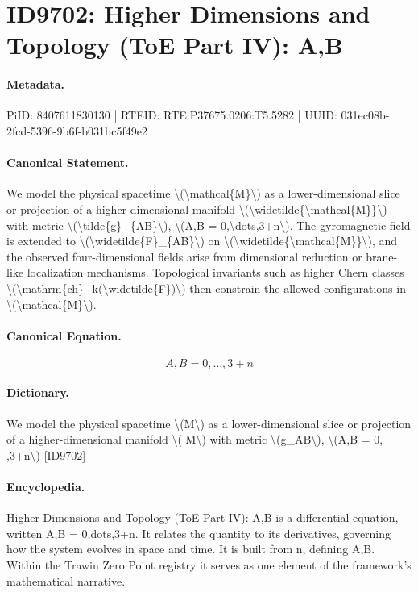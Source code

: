 \section*{ID9702: Higher Dimensions and Topology (ToE Part IV): A,B}
\paragraph{Metadata.}
PiID: 8407611830130 | RTEID: RTE:P37675.0206:T5.5282 | UUID: 031ec08b-2fcd-5396-9b6f-b031bc5f49e2

\paragraph{Canonical Statement.}
We model the physical spacetime \textbackslash{}(\textbackslash{}mathcal\{M\}\textbackslash{}) as a lower-dimensional slice or projection of a higher-dimensional manifold \textbackslash{}(\textbackslash{}widetilde\{\textbackslash{}mathcal\{M\}\}\textbackslash{}) with metric \textbackslash{}(\textbackslash{}tilde\{g\}\_\{AB\}\textbackslash{}), \textbackslash{}(A,B = 0,\textbackslash{}dots,3+n\textbackslash{}). The gyromagnetic field is extended to \textbackslash{}(\textbackslash{}widetilde\{F\}\_\{AB\}\textbackslash{}) on \textbackslash{}(\textbackslash{}widetilde\{\textbackslash{}mathcal\{M\}\}\textbackslash{}), and the observed four-dimensional fields arise from dimensional reduction or brane-like localization mechanisms. Topological invariants such as higher Chern classes \textbackslash{}(\textbackslash{}mathrm\{ch\}\_k(\textbackslash{}widetilde\{F\})\textbackslash{}) then constrain the allowed configurations in \textbackslash{}(\textbackslash{}mathcal\{M\}\textbackslash{}).

\paragraph{Canonical Equation.}
\[
A,B = 0,\dots,3+n
\]

\paragraph{Dictionary.}
We model the physical spacetime \textbackslash{}(M\textbackslash{}) as a lower-dimensional slice or projection of a higher-dimensional manifold \textbackslash{}( M\textbackslash{}) with metric \textbackslash{}(g\_AB\textbackslash{}), \textbackslash{}(A,B = 0, ,3+n\textbackslash{}) [ID9702]

\paragraph{Encyclopedia.}
Higher Dimensions and Topology (ToE Part IV): A,B is a differential equation, written A,B = 0,dots,3+n. It relates the quantity to its derivatives, governing how the system evolves in space and time. It is built from n, defining A,B. Within the Trawin Zero Point registry it serves as one element of the framework's mathematical narrative.
